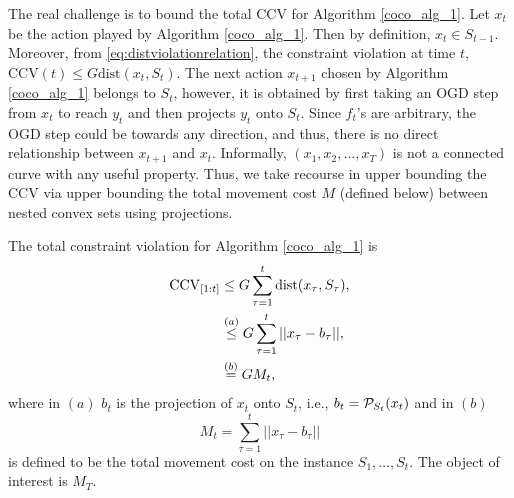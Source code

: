 The real challenge is to bound the total $\text{CCV}$ for Algorithm \ref{coco_alg_1}. 
Let $x_t$ be the action played by Algorithm \ref{coco_alg_1}. Then by definition, $x_t \in S_{t-1}$. Moreover, from \eqref{eq:distviolationrelation}, the constraint violation at time $t$, $\text{CCV}(t) \le G \text{dist}(x_{t}, S_t)$.
The next action $x_{t+1}$ chosen by Algorithm \ref{coco_alg_1} belongs to $S_t$, however, it is obtained by first taking an OGD step from $x_t$ to reach $y_t$ and then projects $y_t$ onto $S_t$. Since $f_t$'s are arbitrary, the OGD step could be towards any direction, and thus, there is no direct relationship between $x_{t+1}$ and $x_t$. Informally, $(x_1, x_2, \dots, x_T)$ is not a connected curve with any useful property. Thus, we take recourse in upper bounding the CCV via upper bounding the total movement cost $M$ (defined below) between nested convex sets using projections.

  The total constraint violation for Algorithm \ref{coco_alg_1} is
\begin{align}\nonumber
\text{CCV}_{[1:t]} & \le G\sum_{\tau=1}^t \text{dist}(x_{\tau}, S_{\tau}), \\ \label{defn:genconvxmovement}
&\stackrel{(a)} \le G  \sum_{\tau=1}^t ||x_{\tau}-  b_\tau||, \\
&\stackrel{(b)} = G M_t,
\end{align}
where in $(a)$ $b_t$ is the projection of $x_t$ onto $S_{t}$, i.e., $b_t=\mathcal{P}_{S_{t}}(x_t)$ and in $(b)$
\begin{equation} \label{defn:totalmovementcost1}
M_t= \sum_{\tau=1}^t ||x_{\tau}-  b_\tau||
\end{equation} is defined to be the  total movement cost  on the instance $S_1, \dots, S_t$. 
The object of interest is $M_T$.

